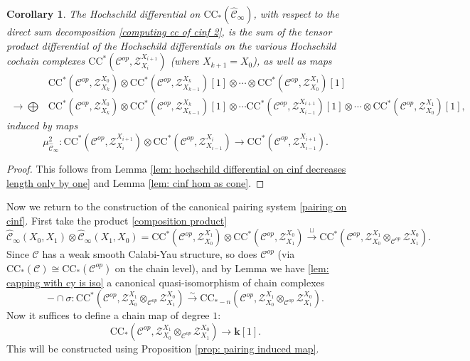 \documentclass[11pt]{amsproc}
\def\K{{\mathbf{k}}}
\def\cZ{\mathcal{Z}}
\def\cc{\mathcal{C}}
\def\r#1{\mathrm{#1}}
\def\cinf{\widehat{\cc}_{\infty}}
\newtheorem{cor}[lem]{Corollary}
\theoremstyle{remark}
\numberwithin{equation}{section}
\begin{document}
\begin{cor}\label{cor: hochschild differential on cinf decreases length only by one}
The Hochschild differential on $\r{CC}_{*}(\cinf)$,
with respect to the direct sum decomposition \eqref{computing cc of cinf 2},
is the sum of the tensor product differential of the Hochschild differentials on the various Hochschild cochain complexes $\r{CC}^{*}(\cc^{op}, \cZ_{X_{i}}^{X_{i+1}})$ (where $X_{k+1}=X_{0}$), 
as well as maps
\begin{equation}\label{contracting differential}
\begin{split}
& \r{CC}^{*}(\cc^{op}, \cZ_{X_{k}}^{X_{0}}) \otimes \r{CC}^{*}(\cc^{op}, \cZ_{X_{k-1}}^{X_{k}})[1] \otimes \cdots \otimes \r{CC}^{*}(\cc^{op}, \cZ_{X_{0}}^{X_{1}})[1]\\
\to \bigoplus &\r{CC}^{*}(\cc^{op}, \cZ_{X_{k}}^{X_{0}}) \otimes \r{CC}^{*}(\cc^{op}, \cZ_{X_{k-1}}^{X_{k}})[1] \otimes \cdots \r{CC}^{*}(\cc^{op}, \cZ_{X_{i-1}}^{X_{i+1}})[1] \otimes \cdots \otimes \r{CC}^{*}(\cc^{op}, \cZ_{X_{0}}^{X_{1}})[1],
\end{split}
\end{equation}
induced by maps
\begin{equation}
\mu^{2}_{\cinf}: \r{CC}^{*}(\cc^{op}, \cZ_{X_{i}}^{X_{i+1}}) \otimes \r{CC}^{*}(\cc^{op}, \cZ_{X_{i-1}}^{X_{i}}) \to \r{CC}^{*}(\cc^{op}, \cZ_{X_{i-1}}^{X_{i+1}}).
\end{equation}
\end{cor}
\begin{proof}
This follows from Lemma \ref{lem: hochschild differential on cinf decreases length only by one} and Lemma \ref{lem: cinf hom as cone}.
\end{proof}

Now we return to the construction of the canonical pairing system \eqref{pairing on cinf}.
First take the product \eqref{composition product}
\begin{equation}\label{cup product for cinf}
\cinf(X_{0}, X_{1}) \otimes \cinf(X_{1}, X_{0}) = \r{CC}^{*}(\cc^{op}, \cZ_{X_{0}}^{X_{1}}) \otimes \r{CC}^{*}(\cc^{op}, \cZ_{X_{1}}^{X_{0}}) \stackrel{\sqcup}\to \r{CC}^{*}(\cc^{op}, \cZ_{X_{0}}^{X_{1}} \otimes_{\cc^{op}} \cZ_{X_{1}}^{X_{0}}).
\end{equation}
Since $\cc$ has a weak smooth Calabi-Yau structure, so does $\cc^{op}$ (via $\r{CC}_{*}(\cc) \cong \r{CC}_{*}(\cc^{op})$ on the chain level), 
and by Lemma we have \ref{lem: capping with cy is iso} a canonical quasi-isomorphism of chain complexes
\begin{equation}\label{cy for cc of Z}
-\cap \sigma: \r{CC}^{*}(\cc^{op}, \cZ_{X_{0}}^{X_{1}} \otimes_{\cc^{op}} \cZ_{X_{1}}^{X_{0}}) \stackrel{\sim}\to \r{CC}_{*-n}(\cc^{op}, \cZ_{X_{0}}^{X_{1}} \otimes_{\cc^{op}} \cZ_{X_{1}}^{X_{0}}).
\end{equation}
Now it suffices to define a chain map of degree $1$:
\begin{equation}\label{trace on cc Z}
\r{CC}_{*}(\cc^{op}, \cZ_{X_{0}}^{X_{1}} \otimes_{\cc^{op}} \cZ_{X_{1}}^{X_{0}}) \to \K[1].
\end{equation}
This will be constructed using Proposition \ref{prop: pairing induced map}.
\end{document}
